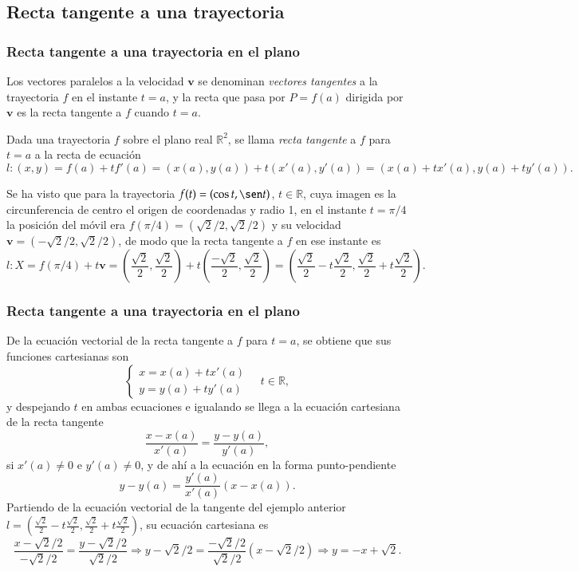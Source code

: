 \subsection{Recta tangente a una trayectoria}
\begin{frame}
	\frametitle{Recta tangente a una trayectoria en el plano}
	Los vectores paralelos a la velocidad $\mathbf{v}$ se denominan \emph{vectores tangentes} a la trayectoria
	$f$ en el instante $t=a$, y la recta que pasa por $P=f(a)$ dirigida por $\mathbf{v}$ es la recta tangente a $f$ cuando
	$t=a$.
	\begin{definicion}
		Dada una trayectoria $f$ sobre el plano real $\mathbb{R}^2$, se llama \emph{recta tangente} a $f$ para $t=a$ a la
		recta de ecuación
		\[
			l: (x,y)= f(a)+tf'(a) = (x(a),y(a))+t(x'(a),y'(a)) = (x(a)+tx'(a),y(a)+ty'(a)).
		\]
	\end{definicion}
	Se ha visto que para la trayectoria $f(t) = (\cos t,\sen t)$, $t\in \mathbb{R}$, cuya imagen es la circunferencia de
	centro el origen de coordenadas y radio 1, en el instante $t=\pi/4$ la posición del móvil era
	$f(\pi/4)=(\sqrt{2}/2,\sqrt{2}/2)$ y su velocidad $\mathbf{v}=(-\sqrt{2}/2,\sqrt{2}/2)$, de modo que la recta tangente a
	$f$ en ese instante es
	\[
		l: X=f(\pi/4)+t\mathbf{v} =
		\left(\frac{\sqrt{2}}{2},\frac{\sqrt{2}}{2}\right)+t\left(\frac{-\sqrt{2}}{2},\frac{\sqrt{2}}{2}\right) =
		\left(\frac{\sqrt{2}}{2}-t\frac{\sqrt{2}}{2},\frac{\sqrt{2}}{2}+t\frac{\sqrt{2}}{2}\right).
	\]
\end{frame}


\begin{frame}
	\frametitle{Recta tangente a una trayectoria en el plano}
	De la ecuación vectorial de la recta tangente a $f$ para $t=a$, se obtiene que sus funciones cartesianas son
	\[
		\begin{cases}
			x=x(a)+tx'(a) \\
			y=y(a)+ty'(a) 
		\end{cases}
		\quad t\in \mathbb{R},
	\]
	y despejando $t$ en ambas ecuaciones e igualando se llega a la ecuación cartesiana de la recta tangente
	\[
		\frac{x-x(a)}{x'(a)}=\frac{y-y(a)}{y'(a)},
	\]
	si $x'(a)\neq 0$ e $y'(a)\neq 0$, y de ahí a la ecuación en la forma punto-pendiente
	\[
		y-y(a)=\frac{y'(a)}{x'(a)}(x-x(a)).
	\]
	Partiendo de la ecuación vectorial de la tangente del ejemplo anterior
	$l=\left(\frac{\sqrt{2}}{2}-t\frac{\sqrt{2}}{2},\frac{\sqrt{2}}{2}+t\frac{\sqrt{2}}{2}\right)$, su ecuación cartesiana
	es
	\[
		\frac{x-\sqrt{2}/2}{-\sqrt{2}/2} = \frac{y-\sqrt{2}/2}{\sqrt{2}/2}\Rightarrow y-\sqrt{2}/2 =
		\frac{-\sqrt{2}/2}{\sqrt{2}/2}(x-\sqrt{2}/2) \Rightarrow y=-x+\sqrt{2}.
	\]
\end{frame}


